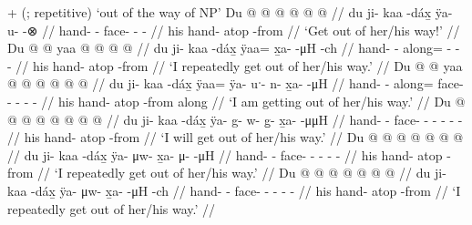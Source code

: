\documentclass[12pt,letterpaper,oneside,article]{memoir}
\begin{document}
\pex\label{ex:motderiv-intro-zoutway}%
\a\label{ex:motderiv-intro-zoutway-deriv}%
%
	 +  (;  repetitive) ‘out of the way of NP’
\a\label{ex:motderiv-intro-zoutway-imp}%
%
\begingl
	\gla	Du  @ {} @ {} 
		 @ {} @ {} @ {} @ {} //
	\glb	du ji- kaa -dáx̱
		ÿa- u- {}  -⊗ //
	\glc	{} hand-  -
		face- - \·  - //
	\gld	his hand- atop -from
		 {} {} {} {} //
	\glft	‘Get out of her/his way!’
		//
\endgl
\a\label{ex:motderiv-intro-zoutway-repimpfv}%
%
\begingl
	\gla	Du  @ {} @ {} 
		yaa @  @ {} @ {} @ {} //
	\glb	du ji- kaa -dáx̱
		ÿaa= x̱a-  -μH -ch //
	\glc	{} hand-  -
		along= -  - - //
	\gld	his hand- atop -from
		 {} {} {} //
	\glft	‘I repeatedly get out of her/his way.’
		//
\endgl
\a\label{ex:motderiv-intro-zoutway-prog}%
%
\begingl
	\gla	Du  @ {} @ {} 
		yaa @  @ {} @ {} @ {} @ {} @ {} //
	\glb	du ji- kaa -dáx̱
		ÿaa= ÿa- uˑ- n- x̱a-  -μH //
	\glc	{} hand-  -
		along= face- - - -  - //
	\gld	his hand- atop -from
		along  {} {} {} {} {} //
	\glft	‘I am getting out of her/his way.’
		//
\endgl
\a\label{ex:motderiv-intro-zoutway-prosp}%
%
\begingl
	\gla	Du  @ {} @ {} 
		 @ {} @ {} @ {} @ {} @ {} @ {} //
	\glb	du ji- kaa -dáx̱
		ÿa- g- w- g̱- x̱a-  -μμH //
	\glc	{} hand-  -
		face- - - - -  - //
	\gld	his hand- atop -from
		 {} {} {} {} {} {} //
	\glft	‘I will get out of her/his way.’
		//
\endgl
\a\label{ex:motderiv-intro-zoutway-pfv}%
%
\begingl
	\gla	Du  @ {} @ {} 
		 @ {} @ {} @ {} @ {} @ {} //
	\glb	du ji- kaa -dáx̱
		ÿa- μw- x̱a- μ-  -μH //
	\glc	{} hand-  -
		face- - - -  - //
	\gld	his hand- atop -from
		 {} {} {} {} {} //
	\glft	‘I repeatedly get out of her/his way.’
		//
\endgl
\a\label{ex:motderiv-intro-zoutway-hab}%
%
\begingl
	\gla	Du  @ {} @ {} 
		 @ {} @ {} @ {} @ {} @ {} //
	\glb	du ji- kaa -dáx̱
		ÿa- μw- x̱a-  -μH -ch //
	\glc	{} hand-  -
		face- - -  - - //
	\gld	his hand- atop -from
		 {} {} {} {} {} //
	\glft	‘I repeatedly get out of her/his way.’
		//
\endgl
\xe
\end{document}
